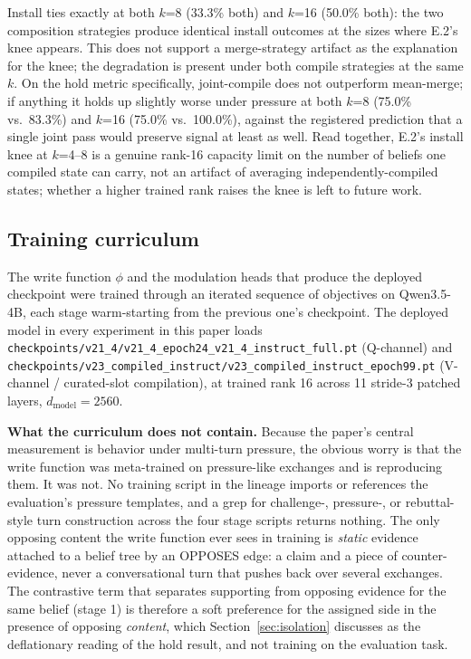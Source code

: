 Install ties exactly at both \(k\)=8 (33.3\% both) and \(k\)=16 (50.0\% both): the two
composition strategies produce identical install outcomes at the sizes where E.2's knee
appears. This does not support a merge-strategy artifact as the explanation for the
knee; the degradation is present under both compile strategies at the same \(k\). On the
hold metric specifically, joint-compile does not outperform mean-merge; if anything it
holds up slightly worse under pressure at both \(k\)=8 (75.0\% vs.\ 83.3\%) and \(k\)=16
(75.0\% vs.\ 100.0\%), against the registered prediction that a single joint pass would
preserve signal at least as well. Read together, E.2's install knee at \(k\)=4--8 is a
genuine rank-16 capacity limit on the number of beliefs one compiled state can carry, not
an artifact of averaging independently-compiled states; whether a higher trained rank
raises the knee is left to future work.

\subsection{Training curriculum}
\label{app:curriculum}

The write function $\phi$ and the modulation heads that produce the deployed checkpoint
were trained through an iterated sequence of objectives on Qwen3.5-4B, each stage
warm-starting from the previous one's checkpoint. The deployed model in every experiment
in this paper loads \texttt{checkpoints/v21\_4/v21\_4\_epoch24\_v21\_4\_instruct\_full.pt}
(Q-channel) and \texttt{checkpoints/v23\_compiled\_instruct/v23\_compiled\_instruct\_epoch99.pt}
(V-channel / curated-slot compilation), at trained rank 16 across 11 stride-3 patched
layers, \(d_{\text{model}}=2560\).

\textbf{What the curriculum does not contain.} Because the paper's central measurement is
behavior under multi-turn pressure, the obvious worry is that the write function was
meta-trained on pressure-like exchanges and is reproducing them. It was not. No training
script in the lineage imports or references the evaluation's pressure templates, and a
grep for challenge-, pressure-, or rebuttal-style turn construction across the four stage
scripts returns nothing. The only opposing content the write function ever sees in training
is \emph{static} evidence attached to a belief tree by an OPPOSES edge: a claim and a piece
of counter-evidence, never a conversational turn that pushes back over several exchanges.
The contrastive term that separates supporting from opposing evidence for the same belief
(stage 1) is therefore a soft preference for the assigned side in the presence of opposing
\emph{content}, which Section~\ref{sec:isolation} discusses as the deflationary reading of
the hold result, and not training on the evaluation task.

